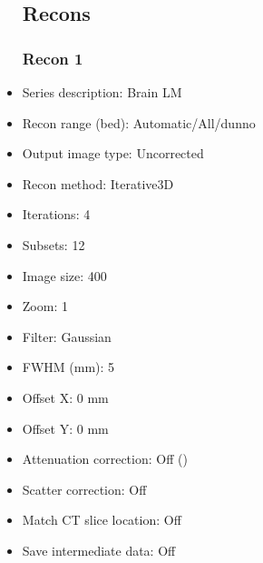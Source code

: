 \documentclass[12pt]{article}
\begin{document}
\begin{itemize}
\subsection{Recons}
\subsubsection{Recon 1}
\item Series description: Brain LM
\item Recon range (bed): Automatic/All/dunno
\item Output image type: Uncorrected
\item Recon method: Iterative3D
\item Iterations: 4
\item Subsets: 12
\item Image size: 400
\item Zoom: 1
\item Filter: Gaussian
\item FWHM (mm): 5
\item Offset X: 0 mm
\item Offset Y: 0 mm
\item Attenuation correction: Off ()
\item Scatter correction: Off
\item Match CT slice location: Off
\item Save intermediate data: Off
\end{itemize}
\end{document}
